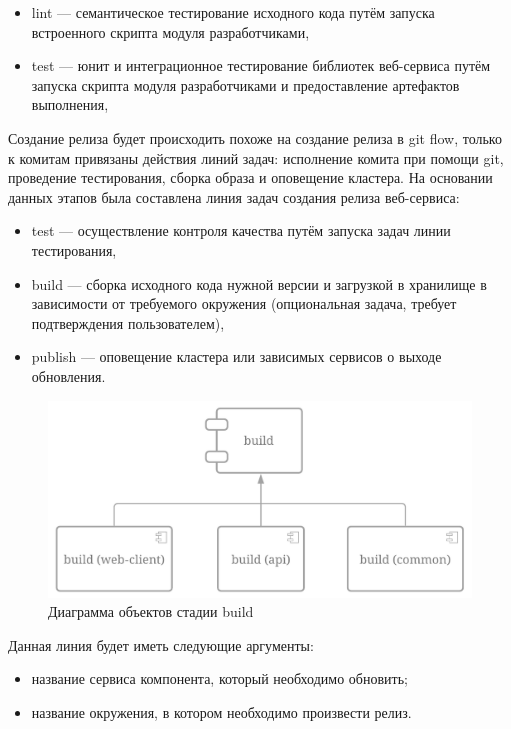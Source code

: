 \begin{itemize}
    \item lint --- семантическое тестирование исходного кода путём запуска встроенного скрипта модуля разработчиками,
    \item test --- юнит и интеграционное тестирование библиотек веб-сервиса путём запуска скрипта модуля разработчиками и предоставление артефактов выполнения,
\end{itemize}

Создание релиза будет происходить похоже на создание релиза в git flow, только к комитам привязаны действия линий задач:
исполнение комита при помощи git, проведение тестирования, сборка образа и оповещение кластера.
На основании данных этапов была составлена линия задач создания релиза веб-сервиса:

\begin{itemize}
    \item test --- осуществление контроля качества путём запуска задач линии тестирования,
    \item build --- сборка исходного кода нужной версии и загрузкой в хранилище в зависимости от требуемого окружения (опциональная задача, требует подтверждения пользователем),
    \item publish --- оповещение кластера или зависимых сервисов о выходе обновления.
\end{itemize}

\begin{figure}[ht]
    \centering
    \includegraphics[scale=0.3]{src/figures/build-components}
    \caption{Диаграмма объектов стадии build}
    \label{fig:build-components}
\end{figure}

Данная линия будет иметь следующие аргументы:

\begin{itemize}
    \item название сервиса компонента, который необходимо обновить;
    \item название окружения, в котором необходимо произвести релиз.
\end{itemize}

